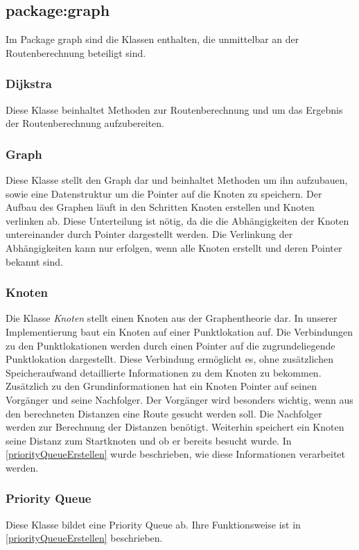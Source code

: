 \documentclass[12pt, a4paper, ngerman]{article}
\begin{document}
\subsection{package:graph}
Im Package graph sind die Klassen enthalten, die unmittelbar an der Routenberechnung beteiligt sind.

\subsubsection{Dijkstra}
Diese Klasse beinhaltet Methoden zur Routenberechnung und um das Ergebnis der Routenberechnung aufzubereiten. 

\subsubsection{Graph}
Diese Klasse stellt den Graph dar und beinhaltet Methoden um ihn aufzubauen, sowie eine Datenstruktur um die Pointer auf die Knoten zu speichern. Der Aufbau des Graphen läuft in den Schritten \glqq Knoten erstellen \grqq und \glqq Knoten verlinken \grqq ab. Diese Unterteilung ist nötig, da die die Abhängigkeiten der Knoten untereinander durch Pointer dargestellt werden. Die Verlinkung der Abhängigkeiten kann nur erfolgen, wenn alle Knoten erstellt und deren Pointer bekannt sind.



\subsubsection{Knoten \label{class:Knoten}}
Die Klasse \textit{Knoten} stellt einen Knoten aus der Graphentheorie dar. In unserer Implementierung baut ein Knoten auf einer Punktlokation auf. Die Verbindungen zu den Punktlokationen werden durch einen Pointer auf die zugrundeliegende Punktlokation dargestellt. Diese Verbindung ermöglicht es, ohne zusätzlichen Speicheraufwand detaillierte Informationen zu dem Knoten zu bekommen. Zusätzlich zu den Grundinformationen hat ein Knoten Pointer auf seinen Vorgänger und seine Nachfolger. Der Vorgänger wird besonders wichtig, wenn aus den berechneten Distanzen eine Route gesucht werden soll. Die Nachfolger werden zur Berechnung der Distanzen benötigt. Weiterhin speichert ein Knoten seine Distanz zum Startknoten und ob er bereits besucht wurde. In \ref{priorityQueueErstellen} wurde beschrieben, wie diese Informationen verarbeitet werden.


\subsubsection{Priority Queue}
Diese Klasse bildet eine Priority Queue ab. Ihre Funktionsweise ist in \ref{priorityQueueErstellen} beschrieben. 
\end{document}
